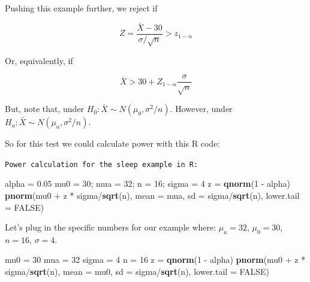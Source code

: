\documentclass[]{article}
\newenvironment{Shaded}{\begin{snugshade}}{\end{snugshade}}
\newcommand{\KeywordTok}[1]{\textcolor[rgb]{0.13,0.29,0.53}{\textbf{{#1}}}}
\newcommand{\DataTypeTok}[1]{\textcolor[rgb]{0.13,0.29,0.53}{{#1}}}
\newcommand{\DecValTok}[1]{\textcolor[rgb]{0.00,0.00,0.81}{{#1}}}
\newcommand{\FloatTok}[1]{\textcolor[rgb]{0.00,0.00,0.81}{{#1}}}
\newcommand{\StringTok}[1]{\textcolor[rgb]{0.31,0.60,0.02}{{#1}}}
\newcommand{\OtherTok}[1]{\textcolor[rgb]{0.56,0.35,0.01}{{#1}}}
\newcommand{\NormalTok}[1]{{#1}}
\begin{document}
Pushing this example further, we reject if

\[Z = \frac{\bar X - 30}{\sigma /\sqrt{n}} > z_{1-\alpha}\]

Or, equivalently, if

\[\bar X > 30 + Z_{1-\alpha} \frac{\sigma}{\sqrt{n}}\]

But, note that, under $H_0 : \bar X \sim N(\mu_0, \sigma^2 / n)$.
However, under $H_a : \bar X \sim N(\mu_a, \sigma^2 / n)$.

So for this test we could calculate power with this R code:

\vspace{1pc}

\verb;Power calculation for the sleep example in R:;

\begin{Shaded}
\begin{Highlighting}[]
\NormalTok{alpha =}\StringTok{ }\FloatTok{0.05}
\NormalTok{mu0 =}\StringTok{ }\DecValTok{30}\NormalTok{; mua =}\StringTok{ }\DecValTok{32}\NormalTok{; n =}\StringTok{ }\DecValTok{16}\NormalTok{; sigma =}\StringTok{ }\DecValTok{4}
\NormalTok{z =}\StringTok{ }\KeywordTok{qnorm}\NormalTok{(}\DecValTok{1} \NormalTok{-}\StringTok{ }\NormalTok{alpha)}
\KeywordTok{pnorm}\NormalTok{(mu0 +}\StringTok{ }\NormalTok{z *}\StringTok{ }\NormalTok{sigma/}\KeywordTok{sqrt}\NormalTok{(n), }\DataTypeTok{mean =} \NormalTok{mua, }\DataTypeTok{sd =} \NormalTok{sigma/}\KeywordTok{sqrt}\NormalTok{(n),}
      \DataTypeTok{lower.tail =} \OtherTok{FALSE}\NormalTok{)}
\end{Highlighting}
\end{Shaded}

Let's plug in the specific numbers for our example where: $\mu_a = 32$,
$\mu_0 = 30$, $n =16$, $\sigma = 4$.

\begin{Shaded}
\begin{Highlighting}[]
\NormalTok{mu0 =}\StringTok{ }\DecValTok{30}
\NormalTok{mua =}\StringTok{ }\DecValTok{32}
\NormalTok{sigma =}\StringTok{ }\DecValTok{4}
\NormalTok{n =}\StringTok{ }\DecValTok{16}
\NormalTok{z =}\StringTok{ }\KeywordTok{qnorm}\NormalTok{(}\DecValTok{1} \NormalTok{-}\StringTok{ }\NormalTok{alpha)}
\KeywordTok{pnorm}\NormalTok{(mu0 +}\StringTok{ }\NormalTok{z *}\StringTok{ }\NormalTok{sigma/}\KeywordTok{sqrt}\NormalTok{(n), }\DataTypeTok{mean =} \NormalTok{mu0, }\DataTypeTok{sd =} \NormalTok{sigma/}\KeywordTok{sqrt}\NormalTok{(n),}
      \DataTypeTok{lower.tail =} \OtherTok{FALSE}\NormalTok{)}
\end{Highlighting}
\end{Shaded}
\end{document}
